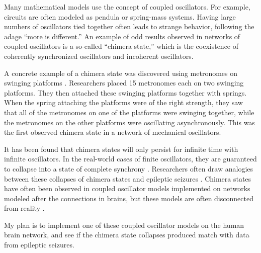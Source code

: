 Many mathematical models use the concept of coupled oscillators.
For example, circuits are often modeled as pendula or spring-mass systems.
Having large numbers of oscillators tied together often leads to strange behavior, following the adage ``more is different.''
An example of odd results observed in networks of coupled oscillators is a so-called ``chimera state,'' which is the coexistence of coherently synchronized oscillators and incoherent oscillators.

A concrete example of a chimera state was discovered using metronomes on swinging platforms \autocite{Martens2013}.
Researchers placed 15 metronomes each on two swinging platforms.
They then attached these swinging platforms together with springs.
When the spring attaching the platforms were of the right strength, they saw that all of the metronomes on one of the platforms were swinging together, while the metronomes on the other platforms were oscillating asynchronously.
This was the first observed chimera state in a network of mechanical oscillators.

It has been found that chimera states will only persist for infinite time with infinite oscillators.
In the real-world cases of finite oscillators, they are guaranteed to collapse into a state of complete synchrony \autocite{Wolfrum2011}.
Researchers often draw analogies between these collapses of chimera states and epileptic seizures \autocite{Andrzejak2016}.
Chimera states have often been observed in coupled oscillator models implemented on networks modeled after the connections in brains, but these models are often disconnected from reality \autocite{Santos2017,Lytton2008}.

My plan is to implement one of these coupled oscillator models on the human brain network, and see if the chimera state collapses produced match with data from epileptic seizures.

